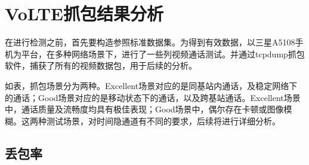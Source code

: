 \section{VoLTE抓包结果分析}
\label{chap:analyze:results}

在进行检测之前，首先要构造参照标准数据集。为得到有效数据，以三星A5108手机为平台，在多种网络场景下，进行了一些列视频通话测试。并通过tcpdump抓包软件，捕获了所有的视频数据包，用于后续的分析。

如表，抓包场景分为两种。Excellent场景对应的是同基站内通话，及稳定网络下的通话；Good场景对应的是移动状态下的通话，以及跨基站通话。Excellent场景中，通话质量及流畅度均具有极佳表现；Good场景中，偶尔存在卡顿或图像模糊。这两种测试场景，对时间隐通道有不同的要求，后续将进行详细分析。

\subsection{丢包率}
\label{chap:analyze:results:plr}

